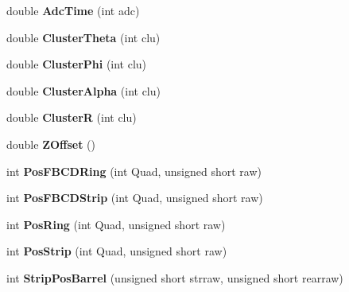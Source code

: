 \begin{DoxyCompactItemize}
double {\bfseries Adc\+Time} (int adc)
\item 
\mbox{\label{class_calibration_af66b845428db545238c5a49d5edadccd}} 
double {\bfseries Cluster\+Theta} (int clu)
\item 
\mbox{\label{class_calibration_a7d041b9f530257c9f717bcaaaef4b200}} 
double {\bfseries Cluster\+Phi} (int clu)
\item 
\mbox{\label{class_calibration_ad2ead82be397c3017dd98e490232abd2}} 
double {\bfseries Cluster\+Alpha} (int clu)
\item 
\mbox{\label{class_calibration_ae30896b904d2d041f4b76effe283bc93}} 
double {\bfseries ClusterR} (int clu)
\item 
\mbox{\label{class_calibration_ada9c3b036839143214a5e41b90f2a78e}} 
double {\bfseries Z\+Offset} ()
\item 
\mbox{\label{class_calibration_a65ab7c201643a2bc8cb366b9ac20ab3b}} 
int {\bfseries Pos\+F\+B\+C\+D\+Ring} (int Quad, unsigned short raw)
\item 
\mbox{\label{class_calibration_a9ee9ef612f7485f5371916bf524bb036}} 
int {\bfseries Pos\+F\+B\+C\+D\+Strip} (int Quad, unsigned short raw)
\item 
\mbox{\label{class_calibration_a240b3ac33e55af3f762d2cecc5d06b2b}} 
int {\bfseries Pos\+Ring} (int Quad, unsigned short raw)
\item 
\mbox{\label{class_calibration_a1d12aea9e2be55852b937e8be3ffbae1}} 
int {\bfseries Pos\+Strip} (int Quad, unsigned short raw)
\item 
\mbox{\label{class_calibration_af2ce93c038cdfd3e9fb1e4ffa093097c}} 
int {\bfseries Strip\+Pos\+Barrel} (unsigned short strraw, unsigned short rearraw)
\end{DoxyCompactItemize}
